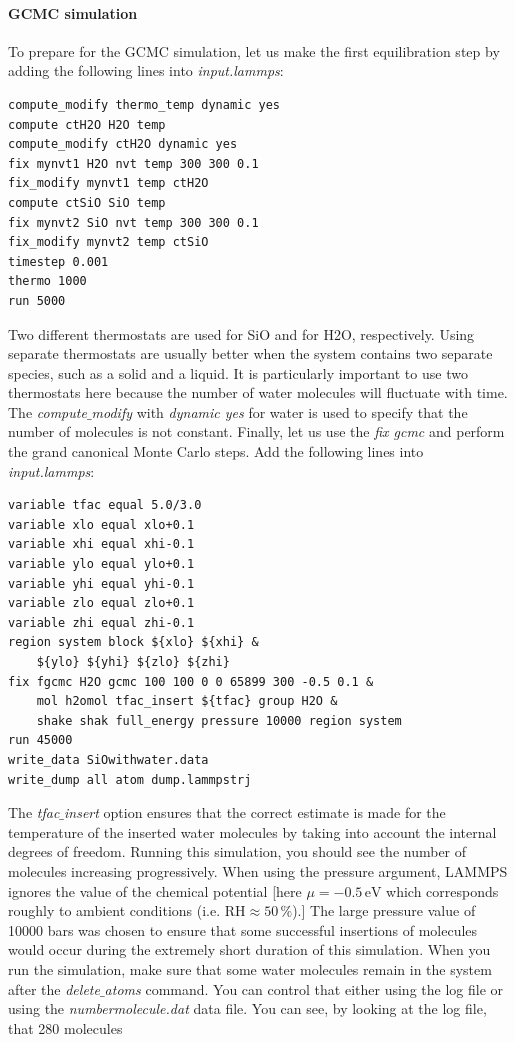 \documentclass[9pt,tutorial]{livecoms}
\begin{document}
\paragraph{GCMC simulation}
To prepare for the GCMC simulation, let us make the first equilibration step by adding the following lines into \textit{input.lammps}:
{\normalsize \begin{verbatim}
compute_modify thermo_temp dynamic yes
compute ctH2O H2O temp
compute_modify ctH2O dynamic yes
fix mynvt1 H2O nvt temp 300 300 0.1
fix_modify mynvt1 temp ctH2O
compute ctSiO SiO temp
fix mynvt2 SiO nvt temp 300 300 0.1
fix_modify mynvt2 temp ctSiO
timestep 0.001
thermo 1000
run 5000
\end{verbatim}}
Two different thermostats are used for SiO and for H2O, respectively. Using  separate thermostats are usually better when the system contains two separate species, such as a solid and a liquid. It is particularly important to use two thermostats
here because the number of water molecules will fluctuate with time. The \textit{compute$\_$modify} with 
\textit{dynamic yes} for water is used to specify that the number of molecules is not constant. Finally, let us use the \textit{fix gcmc} and perform the grand canonical Monte Carlo steps. Add the following lines into \textit{input.lammps}:
{\normalsize \begin{verbatim}
variable tfac equal 5.0/3.0
variable xlo equal xlo+0.1
variable xhi equal xhi-0.1
variable ylo equal ylo+0.1
variable yhi equal yhi-0.1
variable zlo equal zlo+0.1
variable zhi equal zhi-0.1
region system block ${xlo} ${xhi} &
    ${ylo} ${yhi} ${zlo} ${zhi} 
fix fgcmc H2O gcmc 100 100 0 0 65899 300 -0.5 0.1 &
    mol h2omol tfac_insert ${tfac} group H2O &
    shake shak full_energy pressure 10000 region system
run 45000
write_data SiOwithwater.data
write_dump all atom dump.lammpstrj
\end{verbatim}}
The \textit{tfac$\_$insert} option ensures that the correct estimate is made for the temperature of the inserted water molecules by taking into account the internal degrees of freedom. Running this simulation, you should see the number of molecules increasing progressively. When using the pressure argument, LAMMPS ignores the value of the chemical potential [here $\mu = -0.5\,\text{eV}$ which corresponds roughly to ambient conditions (i.e. $\text{RH} \approx 50\,\%$).] The large pressure value of 10000 bars was chosen to ensure that some successful insertions of molecules would occur during the 
extremely short duration of this simulation. When you run the simulation, make sure that some water molecules remain in the system after the \textit{delete$\_$atoms} command. You can control that either using the log file or using the \textit{numbermolecule.dat} data file. You can see, by looking at the log file, that 280 molecules
\end{document}
